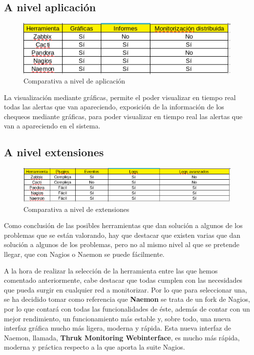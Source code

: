 \subsection{A nivel aplicación} 

\begin{figure}[H]
	\centering
	\includegraphics[scale=0.4]{imagenes/comparativanaemon2.png}
	\caption{Comparativa a nivel de aplicación } \label{comparativa2}
	
\end{figure}
\newpage
La visualización mediante gráficas, permite el poder visualizar en tiempo real todas las alertas que van apareciendo, exposición de la información de los chequeos mediante gráficas, para poder visualizar en tiempo real las alertas que van a apareciendo en el sistema. 
\subsection{A nivel extensiones} 
\begin{figure}[H]
	\centering
	\includegraphics[scale=0.4]{imagenes/comparativanaemon3.png}
	\caption{Comparativa a nivel de extensiones } \label{comparativa3}
	
\end{figure}
Como conclusión de las posibles herramientas que dan solución a algunos de
los problemas que se están valorando, hay que destacar que existen varias que
dan solución a algunos de los problemas, pero no al mismo nivel al que se
pretende llegar, que con Nagios o Naemon se puede fácilmente. 

A la hora de realizar la selección de la herramienta entre las que hemos comentado anteriormente, cabe destacar que todas cumplen con las necesidades que pueda surgir en cualquier red a monitorizar. Por lo que para seleccionar una, se ha decidido tomar como referencia que \textbf{Naemon} se trata de un fork de Nagios, por lo que contará con todas las funcionalidades de éste, además  de contar con  un mejor rendimiento, un funcionamiento más estable y, sobre todo, una nueva interfaz gráfica mucho más ligera, moderna y rápida.  Esta nueva interfaz de Naemon, llamada, \textbf{Thruk Monitoring Webinterface}, es mucho más rápida, moderna y práctica respecto a la que aporta la suite Nagios.

